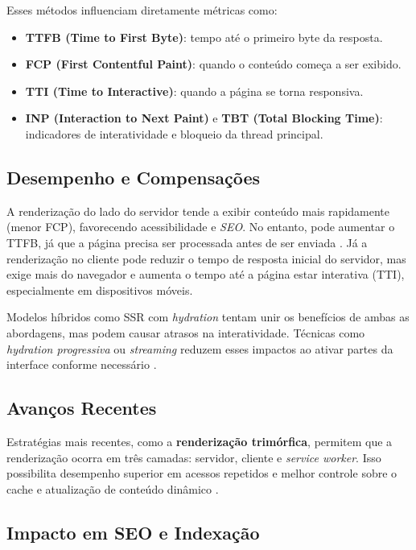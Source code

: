 Esses métodos influenciam diretamente métricas como:

\begin{itemize}
    \item \textbf{TTFB (Time to First Byte)}: tempo até o primeiro byte da resposta.
    \item \textbf{FCP (First Contentful Paint)}: quando o conteúdo começa a ser exibido.
    \item \textbf{TTI (Time to Interactive)}: quando a página se torna responsiva.
    \item \textbf{INP (Interaction to Next Paint)} e \textbf{TBT (Total Blocking Time)}: indicadores de interatividade e bloqueio da thread principal.
\end{itemize}

\subsection*{Desempenho e Compensações}

A renderização do lado do servidor tende a exibir conteúdo mais rapidamente (menor FCP), favorecendo acessibilidade e \textit{SEO}. No entanto, pode aumentar o TTFB, já que a página precisa ser processada antes de ser enviada \cite{osmani2025}. Já a renderização no cliente pode reduzir o tempo de resposta inicial do servidor, mas exige mais do navegador e aumenta o tempo até a página estar interativa (TTI), especialmente em dispositivos móveis.

Modelos híbridos como SSR com \textit{hydration} tentam unir os benefícios de ambas as abordagens, mas podem causar atrasos na interatividade. Técnicas como \textit{hydration progressiva} ou \textit{streaming} reduzem esses impactos ao ativar partes da interface conforme necessário \cite{osmani2025}.

\subsection*{Avanços Recentes}

Estratégias mais recentes, como a \textbf{renderização trimórfica}, permitem que a renderização ocorra em três camadas: servidor, cliente e \textit{service worker}. Isso possibilita desempenho superior em acessos repetidos e melhor controle sobre o cache e atualização de conteúdo dinâmico \cite{osmani2025}.

\subsection*{Impacto em SEO e Indexação}

